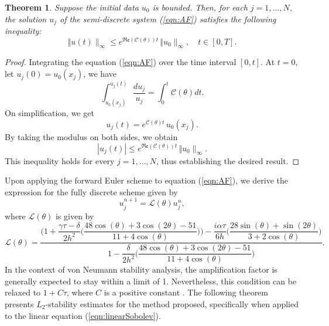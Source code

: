 \documentclass[11pt,a4paper]{amsart}
\theoremstyle{plain}
\newtheorem{theorem}{Theorem}[section]
\theoremstyle{definition}
\theoremstyle{remark}
\numberwithin{equation}{section}
\begin{document}
\begin{theorem}\label{Thm:Decay_estimate}
Suppose the initial data $u_0$ is bounded. Then, for each $j = 1, \dots, N$, the solution $u_j$ of the semi-discrete system (\ref{eqn:AF}) satisfies the following inequality:
\begin{equation}\label{Decay_estimate}
    \Vert u(t) \rVert_{\infty} \leq e^{\mathfrak{Re}(\mathcal{C} (\theta))t} \, \Vert u_0 \rVert_{\infty}, \quad t \in [0, T].
\end{equation}
\end{theorem}
\begin{proof}
Integrating the equation (\ref{eqn:AF}) over the time interval $[0, t]$. At $t=0$, let $u_j(0) = u_0(x_j)$, we have
\begin{equation*}
    \int_{u_0(x_j)}^{u_j(t)} \dfrac{d u_j}{u_j} =\int_{0}^{t} \mathcal{C}(\theta) dt.
\end{equation*}
On simplification, we get
\begin{equation*}
    u_j(t) = e^{\mathcal{C}(\theta)t} \, u_0(x_j).
\end{equation*}
By taking the modulus on both sides, we obtain
\begin{equation*}
    |u_j(t)| \leq e^{\mathfrak{Re}(\mathcal{C}(\theta))t} \, \Vert u_0 \rVert_{\infty}.
\end{equation*}
This inequality holds for every $j = 1, \dots, N$, thus establishing the desired result. 
\end{proof}
\par
Upon applying the forward Euler scheme to equation (\ref{eqn:AF}), we derive the expression for the fully discrete scheme given by
\begin{equation}
    u_j^{n+1} = \mathcal{L}(\theta) u_j^n,
\end{equation}
where $\mathcal{L}(\theta)$ is given by
\begin{equation}\label{eqn:K_1}
    \mathcal{L}(\theta) = \dfrac{\biggl(1+\dfrac{\gamma\tau - \delta}{2h^2} \bigl(\dfrac{48 \cos(\theta) + 3 \cos(2\theta) - 51}{11+4 \cos(\theta)} \bigr)\biggr) - \dfrac{i \alpha \tau}{6h} \bigl(\dfrac{28 \sin(\theta) + \sin(2\theta)}{3+2 \cos(\theta)} \bigr)}{1-\dfrac{\delta}{2h^2} \bigl(\dfrac{48 \cos(\theta) + 3 \cos(2\theta) - 51}{11+4 \cos(\theta)} \bigr)}.
\end{equation}
In the context of von Neumann stability analysis, the amplification factor is generally expected to stay within a limit of 1. Nevertheless, this condition can be relaxed to $1 + C \tau$, where $C$ is a positive constant \cite{leveque2002finite, strikwerda2004finite}. The following theorem presents $L_2$-stability estimates for the method proposed, specifically when applied to the linear equation (\ref{eqn:linearSobolev}).
\end{document}
